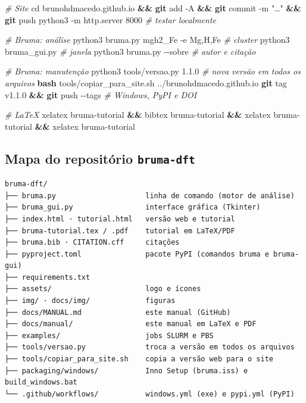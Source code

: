 \documentclass[
  10pt,
]{article}
\newenvironment{Shaded}{\begin{snugshade}}{\end{snugshade}}
\newcommand{\AttributeTok}[1]{\textcolor[rgb]{0.13,0.29,0.53}{#1}}
\newcommand{\BuiltInTok}[1]{#1}
\newcommand{\CommentTok}[1]{\textcolor[rgb]{0.56,0.35,0.01}{\textit{#1}}}
\newcommand{\ExtensionTok}[1]{#1}
\newcommand{\FunctionTok}[1]{\textcolor[rgb]{0.13,0.29,0.53}{\textbf{#1}}}
\newcommand{\KeywordTok}[1]{\textcolor[rgb]{0.13,0.29,0.53}{\textbf{#1}}}
\newcommand{\NormalTok}[1]{#1}
\newcommand{\StringTok}[1]{\textcolor[rgb]{0.31,0.60,0.02}{#1}}
\begin{document}
\begin{Shaded}
\begin{Highlighting}[]
\CommentTok{\# Site}
\BuiltInTok{cd}\NormalTok{ brunohdmacedo.github.io }\KeywordTok{\&\&} \FunctionTok{git}\NormalTok{ add }\AttributeTok{{-}A} \KeywordTok{\&\&} \FunctionTok{git}\NormalTok{ commit }\AttributeTok{{-}m} \StringTok{"…"} \KeywordTok{\&\&} \FunctionTok{git}\NormalTok{ push}
\ExtensionTok{python3} \AttributeTok{{-}m}\NormalTok{ http.server 8000                          }\CommentTok{\# testar localmente}

\CommentTok{\# Bruma: análise}
\ExtensionTok{python3}\NormalTok{ bruma.py mgh2\_Fe }\AttributeTok{{-}e}\NormalTok{ Mg,H,Fe                  }\CommentTok{\# cluster}
\ExtensionTok{python3}\NormalTok{ bruma\_gui.py                                 }\CommentTok{\# janela}
\ExtensionTok{python3}\NormalTok{ bruma.py }\AttributeTok{{-}{-}sobre}                             \CommentTok{\# autor e citação}

\CommentTok{\# Bruma: manutenção}
\ExtensionTok{python3}\NormalTok{ tools/versao.py 1.1.0                        }\CommentTok{\# nova versão em todos os arquivos}
\FunctionTok{bash}\NormalTok{ tools/copiar\_para\_site.sh ../brunohdmacedo.github.io}
\FunctionTok{git}\NormalTok{ tag v1.1.0 }\KeywordTok{\&\&} \FunctionTok{git}\NormalTok{ push }\AttributeTok{{-}{-}tags}                    \CommentTok{\# Windows, PyPI e DOI}

\CommentTok{\# LaTeX}
\ExtensionTok{xelatex}\NormalTok{ bruma{-}tutorial }\KeywordTok{\&\&} \ExtensionTok{bibtex}\NormalTok{ bruma{-}tutorial }\KeywordTok{\&\&} \ExtensionTok{xelatex}\NormalTok{ bruma{-}tutorial }\KeywordTok{\&\&} \ExtensionTok{xelatex}\NormalTok{ bruma{-}tutorial}
\end{Highlighting}
\end{Shaded}

\hypertarget{mapa-do-reposituxf3rio-bruma-dft}{%
\subsection{\texorpdfstring{Mapa do repositório
\texttt{bruma-\allowbreak{}dft}}{Mapa do repositório }}\label{mapa-do-reposituxf3rio-bruma-dft}}

\begin{verbatim}
bruma-dft/
├── bruma.py                     linha de comando (motor de análise)
├── bruma_gui.py                 interface gráfica (Tkinter)
├── index.html · tutorial.html   versão web e tutorial
├── bruma-tutorial.tex / .pdf    tutorial em LaTeX/PDF
├── bruma.bib · CITATION.cff     citações
├── pyproject.toml               pacote PyPI (comandos bruma e bruma-gui)
├── requirements.txt
├── assets/                      logo e ícones
├── img/ · docs/img/             figuras
├── docs/MANUAL.md               este manual (GitHub)
├── docs/manual/                 este manual em LaTeX e PDF
├── examples/                    jobs SLURM e PBS
├── tools/versao.py              troca a versão em todos os arquivos
├── tools/copiar_para_site.sh    copia a versão web para o site
├── packaging/windows/           Inno Setup (bruma.iss) e build_windows.bat
└── .github/workflows/           windows.yml (exe) e pypi.yml (PyPI)
\end{verbatim}
\end{document}
